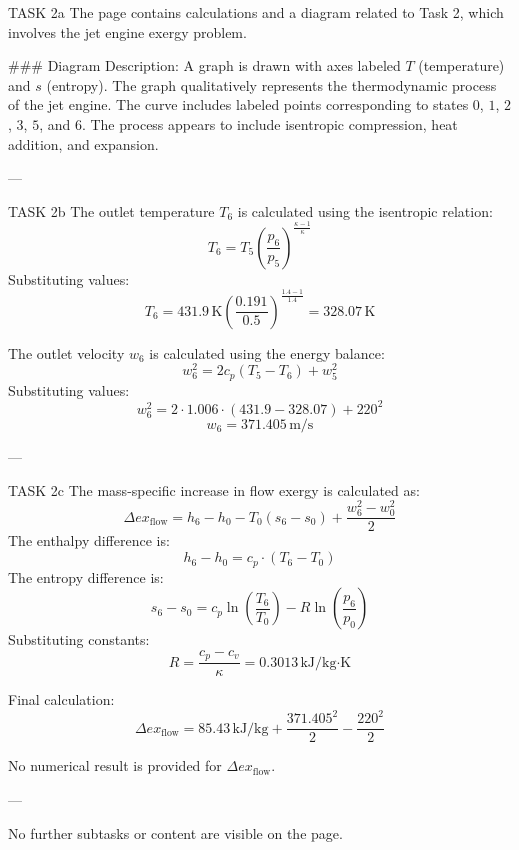 TASK 2a  
The page contains calculations and a diagram related to Task 2, which involves the jet engine exergy problem.  

### Diagram Description:  
A graph is drawn with axes labeled \( T \) (temperature) and \( s \) (entropy). The graph qualitatively represents the thermodynamic process of the jet engine. The curve includes labeled points corresponding to states \( 0 \), \( 1 \), \( 2 \), \( 3 \), \( 5 \), and \( 6 \). The process appears to include isentropic compression, heat addition, and expansion.  

---

TASK 2b  
The outlet temperature \( T_6 \) is calculated using the isentropic relation:  
\[
T_6 = T_5 \left( \frac{p_6}{p_5} \right)^{\frac{\kappa - 1}{\kappa}}
\]  
Substituting values:  
\[
T_6 = 431.9 \, \text{K} \left( \frac{0.191}{0.5} \right)^{\frac{1.4 - 1}{1.4}} = 328.07 \, \text{K}
\]  

The outlet velocity \( w_6 \) is calculated using the energy balance:  
\[
w_6^2 = 2 c_p (T_5 - T_6) + w_5^2
\]  
Substituting values:  
\[
w_6^2 = 2 \cdot 1.006 \cdot (431.9 - 328.07) + 220^2
\]  
\[
w_6 = 371.405 \, \text{m/s}
\]  

---

TASK 2c  
The mass-specific increase in flow exergy is calculated as:  
\[
\Delta ex_{\text{flow}} = h_6 - h_0 - T_0 (s_6 - s_0) + \frac{w_6^2 - w_0^2}{2}
\]  
The enthalpy difference is:  
\[
h_6 - h_0 = c_p \cdot (T_6 - T_0)
\]  
The entropy difference is:  
\[
s_6 - s_0 = c_p \ln \left( \frac{T_6}{T_0} \right) - R \ln \left( \frac{p_6}{p_0} \right)
\]  
Substituting constants:  
\[
R = \frac{c_p - c_v}{\kappa} = 0.3013 \, \text{kJ/kg·K}
\]  

Final calculation:  
\[
\Delta ex_{\text{flow}} = 85.43 \, \text{kJ/kg} + \frac{371.405^2}{2} - \frac{220^2}{2}
\]  

No numerical result is provided for \( \Delta ex_{\text{flow}} \).  

---

No further subtasks or content are visible on the page.